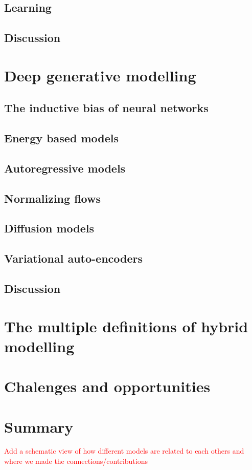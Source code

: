 \subsection{Learning}

\subsection{Discussion}

\section{Deep generative modelling}
\subsection{The inductive bias of neural networks}
\subsection{Energy based models}
\subsection{Autoregressive models}
\subsection{Normalizing flows}
\subsection{Diffusion models}
\subsection{Variational auto-encoders}
\subsection{Discussion}

\section{The multiple definitions of hybrid modelling}

\section{Chalenges and opportunities}

\section{Summary}

\textcolor{red}{Add a schematic view of how different models are related to each others and where we made the connections/contributions}
